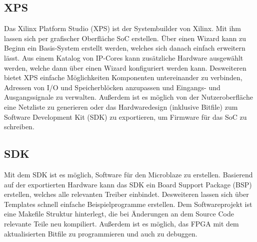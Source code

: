 \subsection{XPS}
Das Xilinx Platform Studio (XPS) ist der Systembuilder von Xilinx. Mit ihm lassen sich per grafischer Oberfläche SoC erstellen. Über einen Wizard kann zu Beginn ein Basis-System erstellt werden, welches sich danach einfach erweitern lässt. Aus einem Katalog von IP-Cores kann zusätzliche Hardware ausgewählt werden, welche dann über einen Wizard konfiguriert werden kann. Desweiteren bietet XPS einfache Möglichkeiten Komponenten untereinander zu verbinden, Adressen von I/O und Speicherblöcken anzupassen und Eingangs- und Ausgangssignale zu verwalten. Außerdem ist es möglich von der Nutzeroberfläche eine Netzliste zu generieren oder das Hardwaredesign (inklusive Bitfile) zum Software Development Kit (SDK) zu exportieren, um Firmware für das SoC zu schreiben. \cite{MBTOOLS}
\subsection{SDK}
Mit dem SDK ist es möglich, Software für den Microblaze zu erstellen. Basierend auf der exportierten Hardware kann das SDK ein Board Support Package (BSP) erstellen, welches alle relevanten Treiber einbindet. Desweiteren lassen sich über Templates schnell einfache Beispielprogramme erstellen. Dem Softwareprojekt ist eine Makefile Struktur hinterlegt, die bei Änderungen an dem Source Code relevante Teile neu kompiliert. Außerdem ist es möglich, das FPGA mit dem aktualisierten Bitfile zu programmieren und auch zu debuggen. \cite{MBTOOLS}

